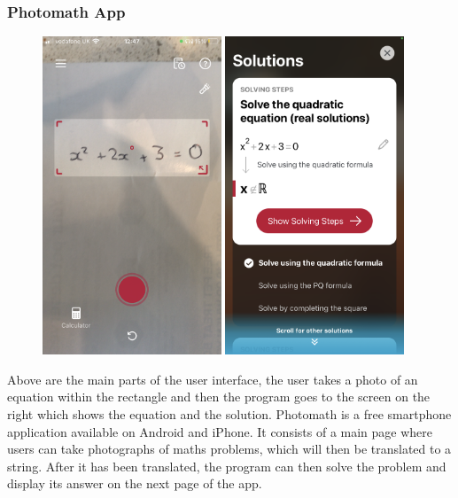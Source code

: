 \documentclass{report}
\begin{document}
\subsubsection{Photomath App}
\begin{figure}[H]
\centering
\includegraphics[width=2.1in]{Images/Photomath/Character Recognition.PNG}
\includegraphics[width=2.1in]{Images/Photomath/Solution Tab.PNG}
\end{figure}
Above are the main parts of the user interface, the user takes a photo of an equation within the rectangle and then the program goes to the screen on the right which shows the equation and the solution.
\newline
Photomath is a free smartphone application available on Android and iPhone. It consists of a main page where users can take photographs of maths problems, which will then be translated to a string. After it has been translated, the program can then solve the problem and display its answer on the next page of the app. 
\end{document}
